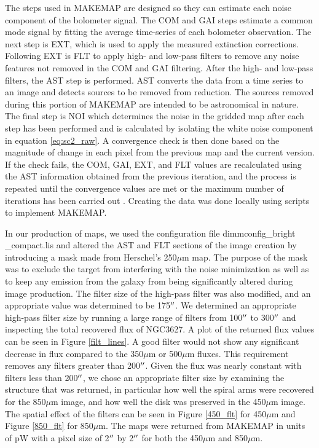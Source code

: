 The steps used in MAKEMAP are designed so they can estimate each noise component of the bolometer signal.  The COM and GAI steps estimate a common mode signal by fitting the average time-series of each bolometer observation.  The next step is EXT, which is used to apply the measured extinction corrections.  Following EXT is FLT to apply high- and low-pass filters to remove any noise features not removed in the COM and GAI filtering.  After the high- and low-pass filters, the AST step is performed.  AST converts the data from a time series to an image and detects sources to be removed from reduction.  The sources removed during this portion of MAKEMAP are intended to be astronomical in nature.  The final step is NOI which determines the noise in the gridded map after each step has been performed and is calculated by isolating the white noise component in equation \ref{eq:sc2_raw}.  A convergence check is then done based on the magnitude of change in each pixel from the previous map and the current version.  If the check fails, the COM, GAI, EXT, and FLT values are recalculated using the AST information obtained from the previous iteration, and the process is repeated until the convergence values are met or the maximum number of iterations has been carried out \citep{chapin2013}.  Creating the data was done locally using scripts to implement MAKEMAP.

In our production of maps, we used the configuration file dimmconfig\_bright \_compact.lis and altered the AST and FLT sections of the image creation by introducing a mask made from Herschel's 250$\mu$m map.  The purpose of the mask was to exclude the target from interfering with the noise minimization as well as to keep any emission from the galaxy from being significantly altered during image production.  The filter size of the high-pass filter was also modified, and an appropriate value was determined to be 175$\mbox{$^{\prime\prime}$}$.  We determined an appropriate high-pass filter size by running a large range of filters from 100$\mbox{$^{\prime\prime}$}$ to 300$\mbox{$^{\prime\prime}$}$ and inspecting the total recovered flux of NGC3627.  A plot of the returned flux values can be seen in Figure \ref{filt_lines}.  A good filter would not show any significant decrease in flux compared to the 350$\mu$m or 500$\mu$m fluxes.  This requirement removes any filters greater than 200$\mbox{$^{\prime\prime}$}$.  Given the flux was nearly constant with filters less than 200$\mbox{$^{\prime\prime}$}$, we chose an appropriate filter size by examining the structure that was returned, in particular how well the spiral arms were recovered for the 850$\mu$m image, and how well the disk was preserved in the 450$\mu$m image.  The spatial effect of the filters can be seen in Figure \ref{450_flt} for 450$\mu$m and Figure \ref{850_flt} for 850$\mu$m.  The maps were returned from MAKEMAP in units of pW with a pixel size of 2$\mbox{$^{\prime\prime}$}$ by 2$\mbox{$^{\prime\prime}$}$ for both the 450$\mu$m and 850$\mu$m.

